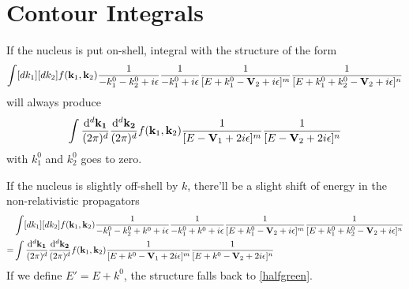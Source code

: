 \documentclass[aps,prd,preprint,showkeys,notitlepage,10pt]{revtex4-1}
\begin{document}
\section{\label{appendix:contour}Contour Integrals}

If the nucleus is put on-shell, integral with the structure of the form
\begin{align}
	\int[dk_1][dk_2]f(\vb{k}_1,\vb{k}_2)\frac{1}{-k_1^0-k_2^0+i\epsilon}\frac{1}{-k_1^0+i\epsilon}\frac{1}{[E+k_1^0-\vb{V}_2+i\epsilon]^m}\frac{1}{[E+k_1^0+k_2^0-\vb{V}_2+i\epsilon]^n}\label{pretemporal}
\end{align}
will always produce
\begin{align}
	\int\frac{\dd^d\vb{k_1}}{(2\pi)^d}\frac{\dd^d\vb{k_2}}{(2\pi)^d}f(\vb{k}_1,\vb{k}_2)\frac{1}{[E-\vb{V}_1+2i\epsilon]^m}\frac{1}{[E-\vb{V}_2+2i\epsilon]^n}\label{halfgreen}
\end{align}
with $k_1^0$ and $k_2^0$ goes to zero.

If the nucleus is slightly off-shell by $k$, there'll be a slight shift of energy in the non-relativistic propagators
\begin{align*}
	  & \int[dk_1][dk_2]f(\vb{k}_1,\vb{k}_2)\frac{1}{-k_1^0-k_2^0+k^0+i\epsilon}\frac{1}{-k_1^0+k^0+i\epsilon}\frac{1}{[E+k_1^0-\vb{V}_2+i\epsilon]^m}\frac{1}{[E+k_1^0+k_2^0-\vb{V}_2+i\epsilon]^n} \\
	= & \int\frac{\dd^d\vb{k_1}}{(2\pi)^d}\frac{\dd^d\vb{k_2}}{(2\pi)^d}f(\vb{k}_1,\vb{k}_2)\frac{1}{[E+k^0-\vb{V}_1+2i\epsilon]^m}\frac{1}{[E+k^0-\vb{V}_2+2i\epsilon]^n}
\end{align*}
If we define $E'=E+k^0$, the structure falls back to \eqref{halfgreen}.
\end{document}
